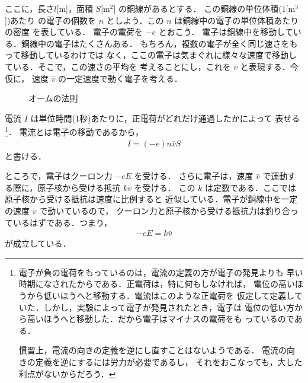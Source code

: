             ここに，長さ$l$[m]，面積 $S$[m${}^{2}$] の銅線があるとする．
            この銅線の単位体積(1[m${}^{3}$])あたり
            の電子の個数を $n$ としよう．この $n$ は銅線中の電子の単位体積あたりの密度
            を表している．
            電子の電荷を $-e$ とおこう．
            電子は銅線中を移動している．銅線中の電子はたくさんある．
            もちろん，複数の電子が全く同じ速さをもって移動しているわけでは
            なく，ここの電子は気まぐれに様々な速度で移動している．そこで，この速さの平均を
            考えることにし，これを $\bar{v}$ と表現する．今仮に，
            速度 $\bar{v}$ の一定速度で動く電子を考える．
                        \begin{figure}[hbt]
                            \begin{center}
                                \label{fig:o-munohousoku}
                                \caption{オームの法則}
                            \end{center}
                        \end{figure}

            電流 $I$ は単位時間(1秒)あたりに，正電荷がどれだけ通過したかによって
            表せる
                \footnote{
                    電子が負の電荷をもっているのは，電流の定義の方が電子の発見よりも
                    早い時期になされたからである．正電荷は，特に何もしなければ，
                    電位の高いほうから低いほうへと移動する．電流はこのような正電荷を
                    仮定して定義していた．しかし，実験によって電子が発見されたとき，電子は
                    電位の低い方から高いほうへと移動した．だから電子はマイナスの電荷をも
                    っているのである．

                    慣習上，電流の向きの定義を逆にし直すことはないようである．
                    電流の向きの定義を逆にするには労力が必要であるし，
                    それをおこなっても，大した利点がないからだろう．
                }．
            電流とは電子の移動であるから，
                \begin{align}\label{eq:teikou_1}
                    I=(-e)n\bar{v}S
                \end{align}
            と書ける．

            ところで，電子はクーロン力 $-eE$ を受ける．
            さらに電子は，速度 $\bar{v}$ で運動する際に，原子核から受ける抵抗 $k\bar{v}$ を受ける．
            この $k$ は定数である．ここでは原子核から受ける抵抗は速度に比例すると
            近似している．電子が銅線中を一定の速度 $\bar{v}$ で動いているので，
            クーロン力と原子核から受ける抵抗力は釣り合っているはずである．つまり，
                \begin{align}\label{teikou_2}
                    -eE=k\bar{v}
                \end{align}
            が成立している．

